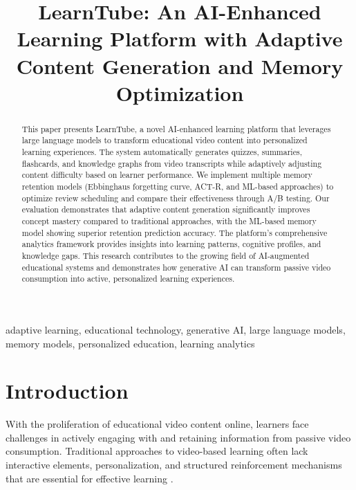 \documentclass[conference]{IEEEtran}
\begin{document}
\title{LearnTube: An AI-Enhanced Learning Platform with Adaptive Content Generation and Memory Optimization\\
}

\author{
}

\maketitle

\begin{abstract}
This paper presents LearnTube, a novel AI-enhanced learning platform that leverages large language models to transform educational video content into personalized learning experiences. The system automatically generates quizzes, summaries, flashcards, and knowledge graphs from video transcripts while adaptively adjusting content difficulty based on learner performance. We implement multiple memory retention models (Ebbinghaus forgetting curve, ACT-R, and ML-based approaches) to optimize review scheduling and compare their effectiveness through A/B testing. Our evaluation demonstrates that adaptive content generation significantly improves concept mastery compared to traditional approaches, with the ML-based memory model showing superior retention prediction accuracy. The platform's comprehensive analytics framework provides insights into learning patterns, cognitive profiles, and knowledge gaps. This research contributes to the growing field of AI-augmented educational systems and demonstrates how generative AI can transform passive video consumption into active, personalized learning experiences.
\end{abstract}

\begin{IEEEkeywords}
adaptive learning, educational technology, generative AI, large language models, memory models, personalized education, learning analytics
\end{IEEEkeywords}

\section{Introduction}
With the proliferation of educational video content online, learners face challenges in actively engaging with and retaining information from passive video consumption. Traditional approaches to video-based learning often lack interactive elements, personalization, and structured reinforcement mechanisms that are essential for effective learning \cite{r1}.
\end{document}
